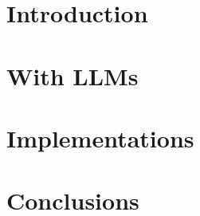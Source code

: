 \section[Intro]{Introduction}


\section[LLMs]{With LLMs}


\section[Impl]{Implementations}


\section[Conclusions]{Conclusions}

